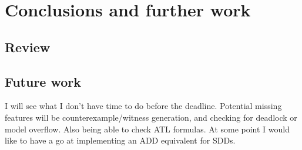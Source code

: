 \documentclass[12]{article}
\begin{document}
\section{Conclusions and further work}

\subsection{Review}

\subsection{Future work}

I will see what I don't have time to do before the deadline. 
Potential missing features will be counterexample/witness generation, and checking for deadlock or model overflow. Also being able to check ATL formulas.
At some point I would like to have a go at implementing an ADD equivalent for SDDs.
\end{document}
